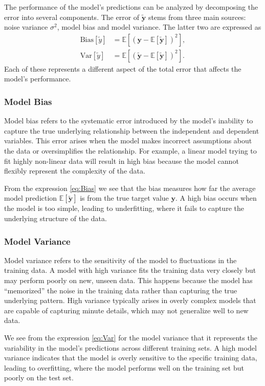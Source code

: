 \documentclass[aps,pra,english,notitlepage,reprint,nofootinbib]{revtex4-1}  %
\begin{document}
The performance of the model's predictions can be analyzed by decomposing the error into several components. The error of $\mathbf{\tilde{y}}$ stems from three main sources: noise variance $\sigma^2$, model bias and model variance. The latter two are expressed as
\begin{align}
  \text{Bias}\left[\tilde{y}\right] &= \mathbb{E}\left[\left(\mathbf{y}-\mathbb{E}\left[\mathbf{\tilde{y}}\right] \right)^2\right], \label{eq:Bias}
  \\
  \text{Var}\left[\tilde{y}\right] &= \mathbb{E}\left[\left(\mathbf{\tilde{y}}-\mathbb{E}\left[\mathbf{\tilde{y}}\right] \right)^2\right]. \label{eq:Var}
\end{align}
Each of these represents a different aspect of the total error that affects the model's performance.

\subsubsection{Model Bias}
Model bias refers to the systematic error introduced by the model's inability to capture the true underlying relationship between the independent and dependent variables. This error arises when the model makes incorrect assumptions about the data or oversimplifies the relationship. For example, a linear model trying to fit highly non-linear data will result in high bias because the model cannot flexibly represent the complexity of the data.

From the expression \eqref{eq:Bias} we see that the bias measures how far the average model prediction $\mathbb{E}[\mathbf{\tilde{y}}]$ is from the true target value $\mathbf{y}$. A high bias occurs when the model is too simple, leading to underfitting, where it fails to capture the underlying structure of the data.

\subsubsection{Model Variance}
Model variance refers to the sensitivity of the model to fluctuations in the training data. A model with high variance fits the training data very closely but may perform poorly on new, unseen data. This happens because the model has ``memorized'' the noise in the training data rather than capturing the true underlying pattern. High variance typically arises in overly complex models that are capable of capturing minute details, which may not generalize well to new data.

We see from the expression \eqref{eq:Var} for the model variance that it represents the variability in the model's predictions across different training sets. A high model variance indicates that the model is overly sensitive to the specific training data, leading to overfitting, where the model performs well on the training set but poorly on the test set.
\end{document}
